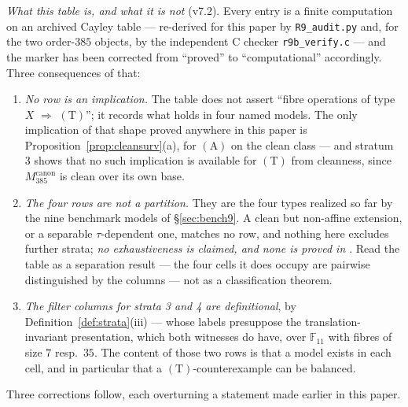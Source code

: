 \documentclass[11pt]{article}
\theoremstyle{plain}
\theoremstyle{definition}
\theoremstyle{remark}
\numberwithin{equation}{section}
\newcommand{\F}{\mathbb{F}}
\begin{document}
\emph{What this table is, and what it is not} (v7.2). Every entry is a finite
computation on an archived Cayley table --- re-derived for this paper by
\texttt{R9\_audit.py} and, for the two order-$385$ objects, by the independent C
checker \texttt{r9b\_verify.c} --- and the marker has been corrected from
``proved'' to ``computational'' accordingly. Three consequences of that:
\begin{enumerate}
\item[(a)] \emph{No row is an implication.} The table does not assert ``fibre
operations of type $X$ $\Rightarrow$ $(\mathrm{T})$''; it records what holds in
four named models. The only implication of that shape proved anywhere in this
paper is Proposition~\ref{prop:cleansurv}(a), for $(\mathrm{A})$ on the clean
class --- and stratum 3 shows that no such implication is available for
$(\mathrm{T})$ from cleanness, since $M_{385}^{\mathrm{canon}}$ is clean over its
own base.
\item[(b)] \emph{The four rows are not a partition.} They are the four types
realized so far by the nine benchmark models of \S\ref{sec:bench9}. A clean but
non-affine extension, or a separable $\tau$-dependent one, matches no row, and
nothing here excludes further strata; \emph{no exhaustiveness is claimed, and
none is proved in \cite{R9A}}. Read the table as a separation result --- the
four cells it does occupy are pairwise distinguished by the columns --- not as a
classification theorem.
\item[(c)] \emph{The filter columns for strata 3 and 4 are definitional},
by Definition~\ref{def:strata}(iii) --- whose labels presuppose the
translation-invariant presentation, which both witnesses do have, over $\F_{11}$
with fibres of size $7$ resp.\ $35$. The content of those two rows is that a
model exists in each cell, and in particular that a $(\mathrm{T})$-counterexample
can be balanced.
\end{enumerate}

Three corrections follow, each overturning a statement made earlier in this paper.
\end{document}
